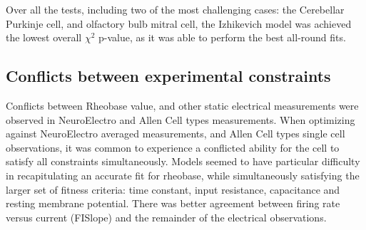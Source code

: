 Over all the tests, including two of the most challenging cases: the Cerebellar Purkinje cell, and olfactory bulb mitral cell, the Izhikevich model was achieved the lowest overall $\chi^{2}$ p-value, as it was able to perform the best all-round fits. %

\subsection{Conflicts between experimental constraints}
Conflicts between Rheobase value, and other static electrical measurements were observed in NeuroElectro and Allen Cell types measurements. When optimizing against NeuroElectro averaged measurements, and Allen Cell types single cell observations, it was common to experience a conflicted ability for the cell to satisfy all constraints simultaneously. 
Models seemed to have particular difficulty in recapitulating an accurate fit for rheobase, while simultaneously satisfying the larger set of fitness criteria: time constant, input resistance, capacitance and resting membrane potential. There was better agreement between firing rate versus current (FISlope) and the remainder of the electrical observations.



%


